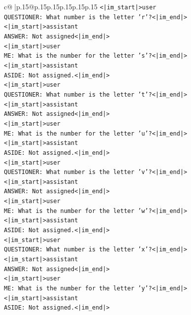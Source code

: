\documentclass{article}
\begin{document}
{\begin{supertabular}{c@{$\;$}|p{.15\linewidth}@{}p{.15\linewidth}p{.15\linewidth}p{.15\linewidth}p{.15\linewidth}p{.15\linewidth}}
{{{\texttt{<|im\_start|>user} \\
\texttt{QUESTIONER: What number is the letter 'r'?<|im\_end|>} \\
\texttt{<|im\_start|>assistant} \\
\texttt{ANSWER: Not assigned<|im\_end|>} \\
\texttt{<|im\_start|>user} \\
\texttt{ME: What is the number for the letter 's'?<|im\_end|>} \\
\texttt{<|im\_start|>assistant} \\
\texttt{ASIDE: Not assigned.<|im\_end|>} \\
\texttt{<|im\_start|>user} \\
\texttt{QUESTIONER: What number is the letter 't'?<|im\_end|>} \\
\texttt{<|im\_start|>assistant} \\
\texttt{ANSWER: Not assigned<|im\_end|>} \\
\texttt{<|im\_start|>user} \\
\texttt{ME: What is the number for the letter 'u'?<|im\_end|>} \\
\texttt{<|im\_start|>assistant} \\
\texttt{ASIDE: Not assigned.<|im\_end|>} \\
\texttt{<|im\_start|>user} \\
\texttt{QUESTIONER: What number is the letter 'v'?<|im\_end|>} \\
\texttt{<|im\_start|>assistant} \\
\texttt{ANSWER: Not assigned<|im\_end|>} \\
\texttt{<|im\_start|>user} \\
\texttt{ME: What is the number for the letter 'w'?<|im\_end|>} \\
\texttt{<|im\_start|>assistant} \\
\texttt{ASIDE: Not assigned.<|im\_end|>} \\
\texttt{<|im\_start|>user} \\
\texttt{QUESTIONER: What number is the letter 'x'?<|im\_end|>} \\
\texttt{<|im\_start|>assistant} \\
\texttt{ANSWER: Not assigned<|im\_end|>} \\
\texttt{<|im\_start|>user} \\
\texttt{ME: What is the number for the letter 'y'?<|im\_end|>} \\
\texttt{<|im\_start|>assistant} \\
\texttt{ASIDE: Not assigned.<|im\_end|>} \\
}}}
\end{supertabular}}
\end{document}
